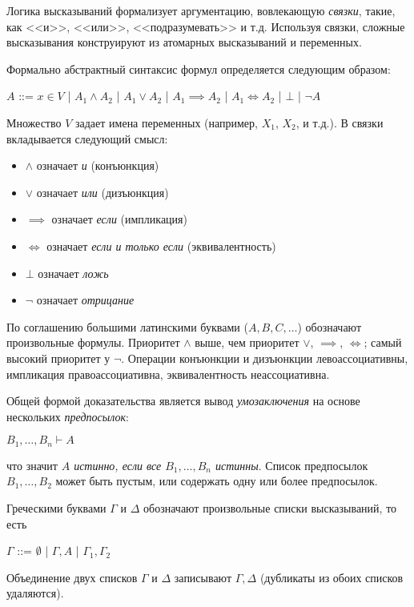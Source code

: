 Логика высказываний формализует аргументацию, вовлекающую \emph{связки}, такие, как <<и>>, <<или>>, <<подразумевать>> и т.д. Используя связки, сложные высказывания конструируют из атомарных высказываний и переменных.

Формально абстрактный синтаксис формул определяется следующим образом:
\begin{center}
$A$ ::= $x \in V$ | $A_1 \land A_2$ | $A_1 \lor A_2$ | $A_1 \implies A_2$ | $A_1 \iff A_2$ | $\bot$ | $\neg A$
\end{center}

Множество $V$ задает имена переменных (например, $X_1$, $X_2$, и т.д.). В связки вкладывается следующий смысл:
\begin{itemize}
\item $\land$ означает \emph{и} (конъюнкция)
\item $\lor$ означает \emph{или} (дизъюнкция)
\item $\implies$ означает \emph{если} (импликация)
\item $\iff$ означает \emph{если и только если} (эквивалентность)
\item $\bot$ означает \emph{ложь}
\item $\neg$ означает \emph{отрицание}
\end{itemize}

По соглашению большими латинскими буквами ($A, B, C, \ldots$) обозначают произвольные формулы. Приоритет $\land$ выше, чем приоритет $\lor$, $\implies$, $\iff$; самый высокий приоритет у $\neg$. Операции конъюнкции и дизъюнкции левоассоциативны, импликация правоассоциативна, эквивалентность неассоциативна.

Общей формой доказательства является вывод \emph{умозаключения} на основе нескольких \emph{предпосылок}:

\begin{center}
$B_1, \ldots, B_n \vdash A$
\end{center}
что значит \emph{$A$ истинно, если все $B_1, \ldots, B_n$ истинны}. Список предпосылок $B_1, \ldots, B_2$ может быть пустым, или содержать одну или более предпосылок.

Греческими буквами $\Gamma$ и $\Delta$ обозначают произвольные списки высказываний, то есть
\begin{center}
$\Gamma$ ::= $\emptyset$ | $\Gamma, A$ | $\Gamma_1, \Gamma_2$
\end{center}

Объединение двух списков $\Gamma$ и $\Delta$ записывают $\Gamma,\Delta$ (дубликаты из обоих списков удаляются).

